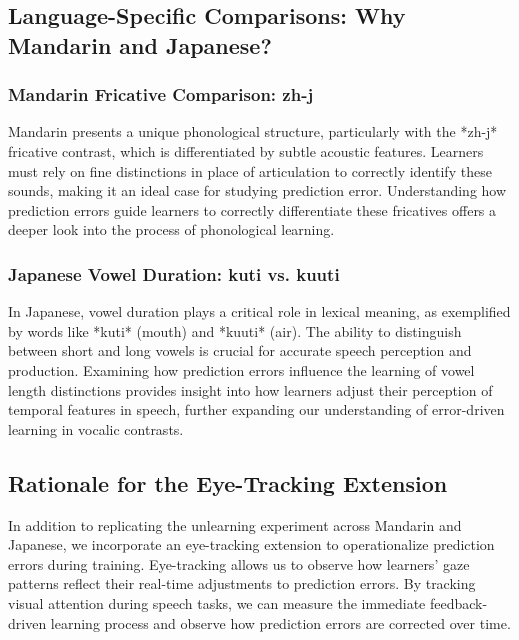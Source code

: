 \subsection{Language-Specific Comparisons: Why Mandarin and Japanese?}

\subsubsection{Mandarin Fricative Comparison: zh-j}

Mandarin presents a unique phonological structure, particularly with the *zh-j* fricative contrast, which is differentiated by subtle acoustic features. Learners must rely on fine distinctions in place of articulation to correctly identify these sounds, making it an ideal case for studying prediction error. Understanding how prediction errors guide learners to correctly differentiate these fricatives offers a deeper look into the process of phonological learning.

\subsubsection{Japanese Vowel Duration: kuti vs. kuuti}

In Japanese, vowel duration plays a critical role in lexical meaning, as exemplified by words like *kuti* (mouth) and *kuuti* (air). The ability to distinguish between short and long vowels is crucial for accurate speech perception and production. Examining how prediction errors influence the learning of vowel length distinctions provides insight into how learners adjust their perception of temporal features in speech, further expanding our understanding of error-driven learning in vocalic contrasts.

\subsection{Rationale for the Eye-Tracking Extension}

In addition to replicating the unlearning experiment across Mandarin and Japanese, we incorporate an eye-tracking extension to operationalize prediction errors during training. Eye-tracking allows us to observe how learners' gaze patterns reflect their real-time adjustments to prediction errors. By tracking visual attention during speech tasks, we can measure the immediate feedback-driven learning process and observe how prediction errors are corrected over time.


